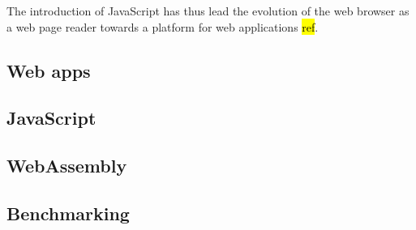 

\begin{comment}

\begin{figure}[!h]
\centering
\texttt{[image: ../Figures/webtechnologies-timeline]}
\caption{Timeline of major web technologies: (a) HTML, (b) CSS, (c) JavaScript and it's newest member (d) WebAssembly.}
\label{figure:webtechnologies-timeline}
\end{figure}
    
\end{comment}

The introduction of JavaScript has thus lead the evolution of the web browser as a web page reader towards a platform for web applications \hl{ref}.

\subsection{Web apps}


\subsection{JavaScript}


\subsection{WebAssembly}


\subsection{Benchmarking}

